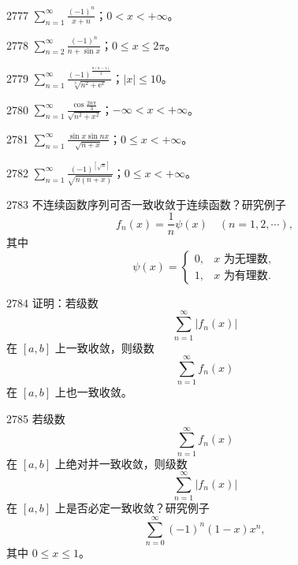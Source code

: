 \begin{prob}[M]{2777}
$\displaystyle\sum_{n=1}^{\infty} \frac{(-1)^n}{x+n}$；$0 < x < +\infty$。
\end{prob}

\begin{prob}[S]{2778}
$\displaystyle\sum_{n=2}^{\infty} \frac{(-1)^n}{n+\sin x}$；$0 \leqslant x \leqslant 2\pi$。
\end{prob}

\begin{prob}[S]{2779}
$\displaystyle\sum_{n=1}^{\infty} \frac{(-1)^{\frac{n(n-1)}{2}}}{\sqrt[3]{n^2+\mathrm{e}^x}}$；$|x| \leqslant 10$。
\end{prob}

\begin{prob}[S]{2780}
$\displaystyle\sum_{n=1}^{\infty} \frac{\cos\frac{2n\pi}{3}}{\sqrt{n^2+x^2}}$；$-\infty < x < +\infty$。
\end{prob}

\begin{prob}[S]{2781}
$\displaystyle\sum_{n=1}^{\infty} \frac{\sin x \sin nx}{\sqrt{n+x}}$；$0 \leqslant x < +\infty$。
\end{prob}

\begin{prob}[S]{2782}
$\displaystyle\sum_{n=1}^{\infty} \frac{(-1)^{[\sqrt{n}]}}{\sqrt{n(n+x)}}$；$0 \leqslant x < +\infty$。
\end{prob}

\begin{prob}[M]{2783}
不连续函数序列可否一致收敛于连续函数？研究例子
\[
f_n(x) = \frac{1}{n}\psi(x) \quad (n=1,2,\cdots),
\]
其中
\[
\psi(x) =
\begin{cases}
0, & x\text{ 为无理数}, \\
1, & x\text{ 为有理数}.
\end{cases}
\]
\end{prob}

\begin{prob}[M]{2784}
证明：若级数
\[
\sum_{n=1}^{\infty} |f_n(x)|
\]
在 $[a,b]$ 上一致收敛，则级数
\[
\sum_{n=1}^{\infty} f_n(x)
\]
在 $[a,b]$ 上也一致收敛。
\end{prob}

\begin{prob}[M]{2785}
若级数
\[
\sum_{n=1}^{\infty} f_n(x)
\]
在 $[a,b]$ 上绝对并一致收敛，则级数
\[
\sum_{n=1}^{\infty} |f_n(x)|
\]
在 $[a,b]$ 上是否必定一致收敛？研究例子
\[
\sum_{n=0}^{\infty} (-1)^n (1-x)x^n,
\]
其中 $0 \leqslant x \leqslant 1$。
\end{prob}

